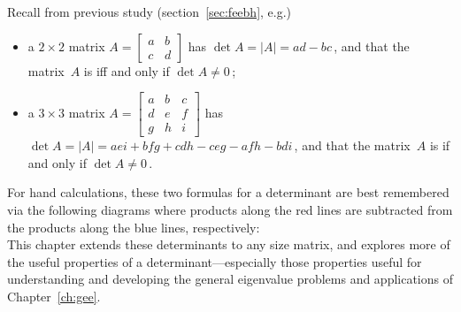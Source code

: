 Recall from previous study (section~\ref{sec:feebh}, e.g.)
\begin{itemize}
\item a \(2\times 2\) matrix \(A=\begin{bmatrix} a&b\\c&d \end{bmatrix}\) has  \(\det A=|A|=ad-bc\)\,, and that the matrix~\(A\) is   iff and only if \(\det A\neq0\)\,;
\item a \(3\times 3\) matrix \(A=\begin{bmatrix} a&b&c\\d&e&f\\g&h&i \end{bmatrix}\) has  \(\det A=|A|=aei+bfg+cdh-ceg-afh-bdi\)\,, and that the matrix~\(A\) is  if and only if \(\det A\neq0\)\,.
\end{itemize}
For hand calculations, these two formulas for a determinant are best remembered via the following diagrams where products along the red lines are subtracted from the products along the blue lines, respectively:
\begin{equation}

\label{eq:dets23b}
\end{equation}
This chapter extends these determinants to any size matrix, and explores more of the useful properties of a determinant---especially those properties useful for understanding and developing the general eigenvalue problems and applications of Chapter~\ref{ch:gee}.





\endinput

